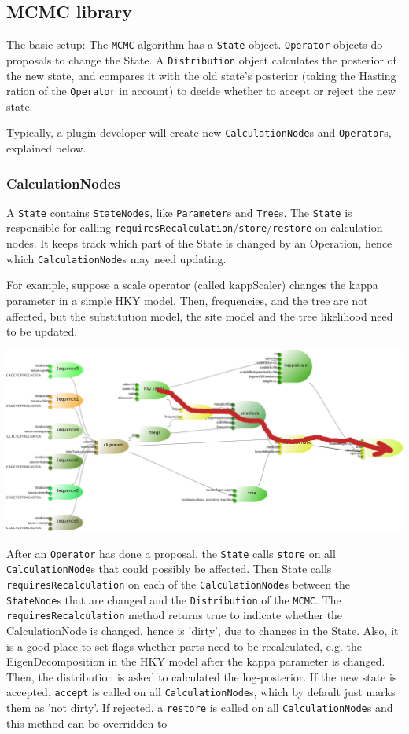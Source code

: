 \documentclass{article}
\begin{document}
\subsection{MCMC library\label{ssec.mcmc}}

The basic setup: The {\tt MCMC} algorithm has a {\tt State} object. {\tt Operator} objects do 
proposals to change the State. A {\tt Distribution} object calculates the posterior of the
new state, and compares it with the old state's posterior (taking the Hasting ration of the
{\tt Operator} in account) to decide whether to accept or reject the new state.

Typically, a plugin developer will create new {\tt CalculationNode}s and {\tt Operator}s,
explained below.

\subsubsection{CalculationNodes\label{ssec.calc}}

A {\tt State} contains {\tt StateNodes}, like {\tt Parameter}s and {\tt Tree}s. The {\tt State}
is responsible for calling {\tt requiresRecalculation}/{\tt store}/{\tt restore} on calculation nodes. It keeps
track which part of the State is changed by an Operation, hence which {\tt CalculationNode}s
may need updating.

For example, suppose a scale operator (called kappScaler) changes the kappa parameter in
a simple HKY model. Then, frequencies, and the tree are not affected, but the substitution
model, the site model and the tree likelihood need to be updated.

\includegraphics[width=\textwidth]{hky.png}

After an {\tt Operator} has done a proposal, the {\tt State} calls {\tt store} on all {\tt CalculationNode}s
that could possibly be affected.
Then State calls {\tt requiresRecalculation} on each of the 
{\tt CalculationNode}s between the {\tt StateNode}s that are changed and the {\tt Distribution} of the {\tt MCMC}.
The {\tt requiresRecalculation} method returns true to indicate whether the CalculationNode
is changed, hence is 'dirty', due to changes in the State. Also, it is a good place to set
flags whether parts need to be recalculated, e.g. the EigenDecomposition in the HKY model
after the kappa parameter is changed.
Then, the distribution is asked to calculated the log-posterior. If the new state is
accepted, {\tt accept} is called on all {\tt CalculationNode}s, which by default just marks
them as 'not dirty'. If rejected, a {\tt restore} is called on all {\tt CalculationNode}s
and this method can be overridden to 
\end{document}
